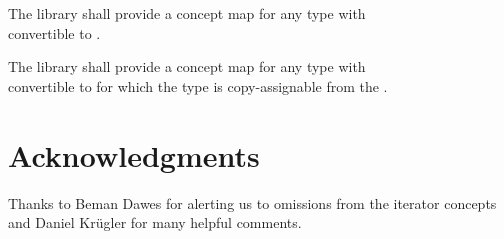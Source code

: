 \documentclass[american,twoside]{book}
\begin{document}
\pnum
The library shall provide a concept map
for any type  with
\\ convertible to
.

\pnum
The library shall provide a concept map
for any type  with
\\ convertible to
 for which the  type is
copy-assignable from the .
\color{black}

\section*{Acknowledgments}
Thanks to Beman Dawes for alerting us to omissions from the iterator
concepts and Daniel Kr\"ugler for many helpful comments.



\end{document}

